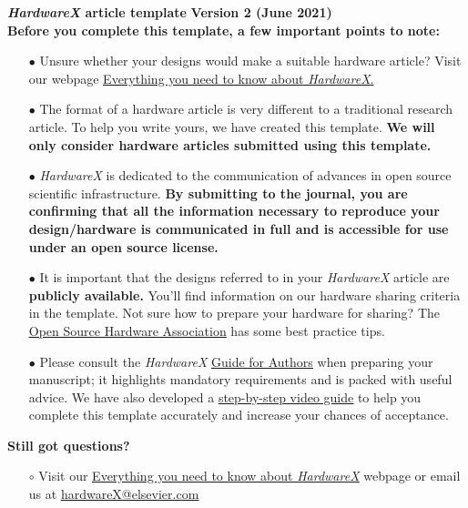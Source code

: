 \documentclass[11pt, letterpaper]{article}
\begin{document}
\begin{flushleft}

{\Huge \bf {\it HardwareX} article template} \textbf{Version 2 (June 2021)}\\
\vskip 0.5cm
{\bf Before you complete this template, a few important points to note:}

\begin{itemize}
\item[$\bullet$]Unsure whether your designs would make a suitable hardware article? Visit our webpage \href{https://www.journals.elsevier.com/hardwarex/submit-your-hardware/everything-you-need-to-know-about-hardwarex}{\underline{Everything you need to know about {\it HardwareX}}.}
\item[$\bullet$]The format of a hardware article is very different to a traditional research article. To help you write yours, we have created this template. {\bf We will only consider hardware articles submitted using this template.}
\item[$\bullet$]{\it HardwareX} is dedicated to the communication of advances in open source scientific infrastructure. {\bf By submitting to the journal, you are confirming that all the information necessary to reproduce your design/hardware is communicated in full and is accessible for use under an open source license.}
\item[$\bullet$]It is important that the designs referred to in your {\it HardwareX} article are {\bf publicly available.} You’ll find information on our hardware sharing criteria in the template. Not sure how to prepare your hardware for sharing? The \href{https://www.oshwa.org/sharing-best-practices/}{\underline{Open Source Hardware Association}} has some best practice tips.
\item[$\bullet$]Please consult the {\it HardwareX} \href{https://www.elsevier.com/journals/hardwarex/2468-0672/guide-for-authors}{\underline{Guide for Authors}} when preparing your manuscript; it highlights mandatory requirements and is packed with useful advice. We have also developed a \href{https://www.journals.elsevier.com/hardwarex/submit-your-hardware/how-to-submit-your-scientific-hardware-article-to-hardwarex}{\underline{step-by-step video guide}} to help you complete this template accurately and increase your chances of acceptance.
\end{itemize}
{\bf Still got questions?}\\
\begin{itemize}
\item[$\circ$] Visit our \href{https://www.journals.elsevier.com/hardwarex/submit-your-hardware/everything-you-need-to-know-about-hardwarex}{\underline{Everything you need to know about {\it HardwareX}}} webpage or email us at \href{mailto:hardwareX@elsevier.com}{\underline{hardwareX@elsevier.com}}
\end{itemize}


\end{flushleft}
\end{document}
